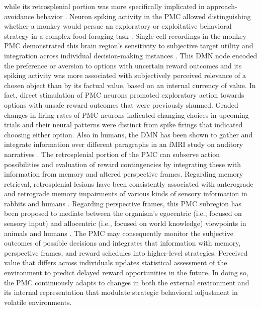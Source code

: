\documentclass{article} %
\begin{document}
while its retrosplenial portion was
more specifically implicated in approach-avoidance behavior
\citep{vann2009does}.
Neuron spiking activity in the PMC allowed distinguishing
whether a monkey would persue an exploratory or exploitative
behavioral strategy in a complex food foraging task \citep{pearson2009neurons}.
Single-cell recordings in the monkey PMC
demonstrated this brain region's sensitivity to
subjective target utility \citep{mccoy2005risk} and integration
across individual decision-making instances \citep{pearson2009neurons}.
This DMN node encoded the
preference or aversion to options with uncertain reward outcomes
and its spiking activity was more associated with
subjectively perceived relevance of a chosen object
than by its factual value, based on an internal currency of value.
In fact, direct stimulation of PMC neurons
promoted exploratory action towards options
with unsafe reward outcomes that were previously shunned.
Graded changes in firing rates of PMC neurons
indicated changing choices in upcoming trials and their neural patterns were
distinct from spike firings that indicated choosing either option.
Also in humans,
the DMN has been shown to gather and integrate information
over different paragraphs in an fMRI study on auditory narratives
\citep{simony2016dynamic}.
%
The retrosplenial portion of the PMC can subserve action possibilities
and evaluation of reward contingencies by integrating these with
information from memory and altered perspective frames.
Regarding memory retrieval, retrosplenial lesions have been
consistently associated with anterograde and retrograde memory impairments
of various kinds of sensory information
in rabbits and humans
\citep{vann2009does}.
Regarding perspective frames, this PMC subregion has been
proposed to mediate between the organism's egocentric
(i.e., focused on sensory input) and
allocentric (i.e., focused on world knowledge) viewpoints
in animals and humans
\citep{epstein2008parahippocampal, burgess2008spatial, valiquette2007different}.
%
The PMC may consequently monitor the subjective outcomes
of possible decisions and integrates that information
with memory, perspective frames, and
reward schedules into higher-level strategies.
Perceived value that differs across individuals updates
statistical assessment of the environment
to predict delayed reward opportunities in the future.
In doing so, the PMC continuously adapts to changes
in both the external environment and its internal representation
that modulate strategic behavioral adjustment in volatile environments.
\end{document}
